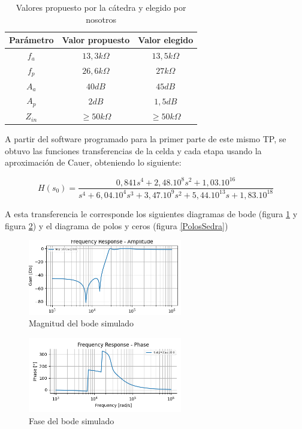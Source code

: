 \begin{table}[h]
\begin{tabular}{@{}|c|c|c|@{}}
\toprule
\textbf{Parámetro} & \textbf{Valor propuesto} & \textbf{Valor elegido} \\ \midrule
$f_a$              & $13,3k\Omega$              & $13,5k\Omega$            \\
$f_p$              & $26,6k\Omega$              & $27k\Omega$              \\
$A_a$              & $40dB$                     & $45dB$      			   \\
$A_p$              & $2dB$                      & $1,5dB$				   \\
$Z_{in}$           & $\geq50k\Omega$            & $\geq50k\Omega$           
\end{tabular}
\centering
\caption{Valores propuesto por la cátedra y elegido por nosotros}
\label{tabla componentes}
\end{table}

A partir del software programado para la primer parte de este mismo TP, se obtuvo las funciones transferencias de la celda y cada etapa usando la aproximación de Cauer, obteniendo lo siguiente:

\begin{equation}
H(s_0) = \frac{0,841 s^4 + 2,48.10^8 s^2 + 1,03.10^{16}}{s^4 + 6,04.10^4 s^3 + 3,47.10^9 s^2 + 5,44.10^{13} s + 1,83.10^{18}}
\end{equation}

A esta transferencia le corresponde los siguientes diagramas de bode (figura \ref{BodeSimulado} y figura \ref{FaseSimulado}) y el diagrama de polos y ceros (figura \ref{PolosSedra})

\begin{figure}[h]
	\includegraphics[width=0.6\textwidth]{../Ejercicio2-DisenoDeCeldas/3CeldaSedra/Imagenes/MagnitudSedra.png}
	\centering
	\caption{Magnitud del bode simulado}
	\label{BodeSimulado}
\end{figure}

\begin{figure}[h]
	\includegraphics[width=0.6\textwidth]{../Ejercicio2-DisenoDeCeldas/3CeldaSedra/Imagenes/Fase Sedra.png}
	\centering
	\caption{Fase del bode simulado}
	\label{FaseSimulado}
\end{figure}

